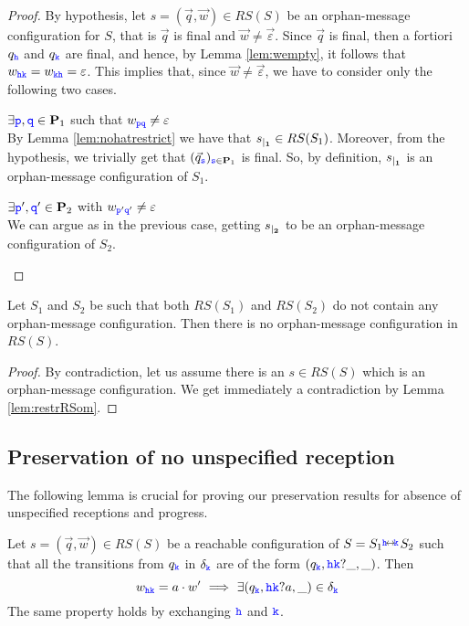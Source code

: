 \begin{proof}
By hypothesis,  let $s= (\vec{q},\vec{w}) \in RS(S)$ be an orphan-message configuration for $S$, 
that is $\vec{q}$ is final and $\vec{w}\neq \vec{\varepsilon}$.
Since $\vec{q}$ is final, then a fortiori $q_{\mathtt{\color{blue}{ {h}}}}$ and $q_{\mathtt{\color{blue}{ {k}}}}$ are final, and hence, by Lemma \ref{lem:wempty}, it follows that $w_{{\mathtt{\color{blue}{ {h}}}}{\mathtt{\color{blue}{ {k}}}}} = w_{{\mathtt{\color{blue}{ {k}}}}{\mathtt{\color{blue}{ {h}}}}} = \varepsilon$.
This implies that, since  $\vec{w}\neq \vec{\varepsilon}$, we have to consider only the following two cases.
\begin{description}
\item
$\exists { \ensuremath{\mathtt{\color{blue}{ {p}}}} },{\mathtt{\color{blue}{ {q}}}}\in \mathbf{P}_1$ such that  $w_{{\mathtt{\color{blue}{ {p}}}}{\mathtt{\color{blue}{ {q}}}}}\neq\varepsilon$\\
By Lemma \ref{lem:nohatrestrict} we have that ${s}_{\mid_{\mathbf{1}}}\in RS(S_1)$. Moreover, from the hypothesis, we 
trivially get that $(\vec{q}_{\mathtt{\color{blue}{ {s}}}})_{{\mathtt{\color{blue}{ {s}}}}\in\mathbf{P}_1}$ is final. So, by definition, ${s}_{\mid_{\mathbf{1}}}$ is an  orphan-message configuration of $S_1$.
\item
$\exists { \ensuremath{\mathtt{\color{blue}{ {p}}}} }',{\mathtt{\color{blue}{ {q}}}}'\in \mathbf{P}_2$ with  $w_{{\mathtt{\color{blue}{ {p}}}}'{\mathtt{\color{blue}{ {q}}}}'}\neq\varepsilon$ \\
We can argue as in the previous case, getting  ${s}_{\mid_{\mathbf{2}}}$ to be an  orphan-message configuration of $S_2$.
\end{description}
\end{proof}

\begin{corollary}%
\label{prop:nomPreservation}
Let $S_1$ and $S_2$ be such that both  $RS(S_{1})$ and $RS(S_{2})$ do not contain any orphan-message configuration.
Then there is no orphan-message configuration in $RS(S)$.
\end{corollary}
\begin{proof}
By contradiction, let us assume there is an $s\in RS(S)$ which is an orphan-message configuration. We get
immediately a contradiction by Lemma \ref{lem:restrRSom}.
\end{proof}


\subsection{Preservation of no unspecified reception}

The following lemma is crucial for proving our preservation results for absence of unspecified receptions and progress.


\begin{lemma}%
\label{lem:getright}
Let $s= (\vec{q},\vec{w}) \in RS(S)$ be a reachable configuration of
$S={S_{1}}\stackrel{\hspace{-3pt}{ \ensuremath{\mathtt{\color{blue}{ {h}}}} }\!\leftrightarrow\!{\mathtt{\color{blue}{ {k}}}}\!}{} {S_{2}}$ such that 
all the transitions from $q_{\mathtt{\color{blue}{ {k}}}}$ in $\delta_{\mathtt{\color{blue}{ {k}}}}$ are of the form $(q_{\mathtt{\color{blue}{ {k}}}},{\mathtt{\color{blue}{ {h}}}}{\mathtt{\color{blue}{ {k}}}}?\_,\_)$.
Then
$$w_{{\mathtt{\color{blue}{ {h}}}}{\mathtt{\color{blue}{ {k}}}}}= a\cdot w' ~\Longrightarrow~  \exists (q_{\mathtt{\color{blue}{ {k}}}},{\mathtt{\color{blue}{ {h}}}}{\mathtt{\color{blue}{ {k}}}}?a,\_)\in\delta_{\mathtt{\color{blue}{ {k}}}}$$
The same property holds by exchanging ${\mathtt{\color{blue}{ {h}}}}$ and ${\mathtt{\color{blue}{ {k}}}}$.
 \end{lemma}
 
